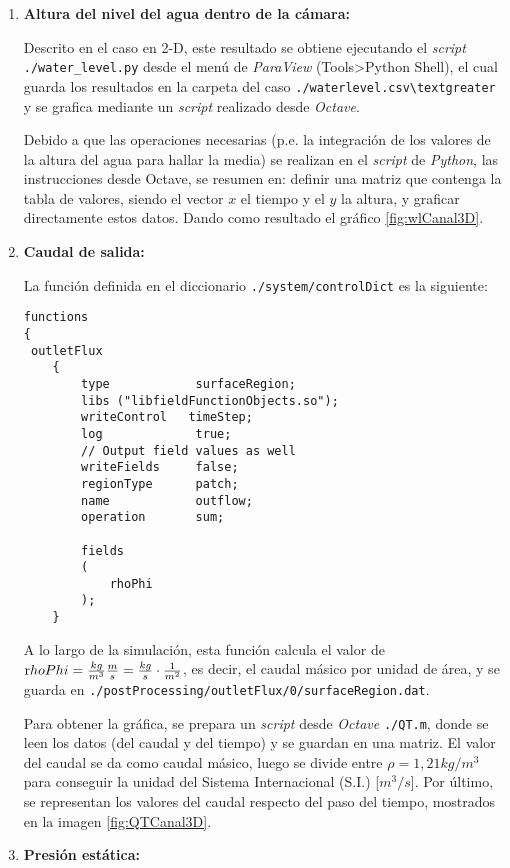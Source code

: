 \begin{enumerate}
\def\labelenumi{\arabic{enumi}.}
\item
  \textbf{Altura del nivel del agua dentro de la cámara:}

  Descrito en el caso en 2-D, este resultado se obtiene ejecutando el
  \emph{script} \lstinline[style=bash]{./water_level.py} desde el menú
  de \emph{ParaView} (Tools\textgreater{}Python Shell), el cual guarda
  los resultados en la carpeta del caso
  \lstinline[style=bash]{./waterlevel.csv\textgreater} y se grafica mediante un
  \emph{script} realizado desde \emph{Octave}.

  Debido a que las operaciones necesarias (p.e. la integración de los
  valores de la altura del agua para hallar la media) se realizan en el
  \emph{script} de \emph{Python}, las instrucciones desde Octave, se
  resumen en: definir una matriz que contenga la tabla de valores,
  siendo el vector $x$ el tiempo y el $y$ la altura, y graficar
  directamente estos datos. Dando como resultado el gráfico \autoref{fig:wlCanal3D}.

\item
  \textbf{Caudal de salida:}

  La función definida en el diccionario
  \lstinline[style=bash]{./system/controlDict} es la siguiente:

\begin{lstlisting}[style=c++]
functions
{
 outletFlux
    {
        type            surfaceRegion;
        libs ("libfieldFunctionObjects.so");
        writeControl   timeStep;
        log             true;
        // Output field values as well
        writeFields     false;
        regionType      patch;
        name            outflow;
        operation       sum;

        fields
        (
            rhoPhi
        );
    }
\end{lstlisting}

  A lo largo de la simulación, esta función calcula el valor de
  \(\text rhoPhi=\frac {kg}{m^3} \frac {m}{s}= \frac {kg}{s} \cdot \frac {1}{m^2}\),
  es decir, el caudal másico por unidad de área, y se guarda en
  \lstinline[style=bash]{./postProcessing/outletFlux/0/surfaceRegion.dat}.

  Para obtener la gráfica, se prepara un \emph{script} desde
  \emph{Octave} \lstinline[style=bash]{./QT.m}, donde se leen los datos
  (del caudal y del tiempo) y se guardan en una matriz. El valor del
  caudal se da como caudal másico, luego se divide entre
  \(\rho=1,21kg/m^3\) para conseguir la unidad del Sistema Internacional
  (S.I.) {[}\(m^3/s\){]}. Por último, se representan los valores del caudal respecto del paso del tiempo, mostrados en la imagen \autoref{fig:QTCanal3D}.
\item
  \textbf{Presión estática:}


\end{enumerate}
